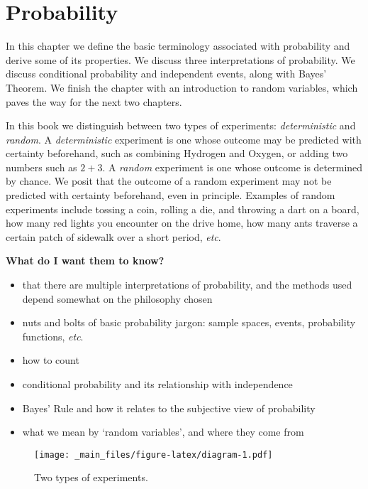 \documentclass[]{book}
\providecommand{\tightlist}{%
  \setlength{\itemsep}{0pt}\setlength{\parskip}{0pt}}
\numberwithin{equation}{chapter}
\numberwithin{figure}{chapter}
\theoremstyle{plain}
\theoremstyle{definition}
\theoremstyle{remark}
\theoremstyle{definition}
\theoremstyle{definition}
\theoremstyle{remark}
\begin{document}
\chapter{Probability}\label{cha-probability}

In this chapter we define the basic terminology associated with
probability and derive some of its properties. We discuss three
interpretations of probability. We discuss conditional probability and
independent events, along with Bayes' Theorem. We finish the chapter
with an introduction to random variables, which paves the way for the
next two chapters.

In this book we distinguish between two types of experiments:
\emph{deterministic} and \emph{random}. A \emph{deterministic}
experiment is one whose outcome may be predicted with certainty
beforehand, such as combining Hydrogen and Oxygen, or adding two numbers
such as \(2+3\). A \emph{random} experiment is one whose outcome is
determined by chance. We posit that the outcome of a random experiment
may not be predicted with certainty beforehand, even in principle.
Examples of random experiments include tossing a coin, rolling a die,
and throwing a dart on a board, how many red lights you encounter on the
drive home, how many ants traverse a certain patch of sidewalk over a
short period, \emph{etc}.

\textbf{What do I want them to know?}

\begin{itemize}
\tightlist
\item
  that there are multiple interpretations of probability, and the
  methods used depend somewhat on the philosophy chosen
\item
  nuts and bolts of basic probability jargon: sample spaces, events,
  probability functions, \emph{etc}.
\item
  how to count
\item
  conditional probability and its relationship with independence
\item
  Bayes' Rule and how it relates to the subjective view of probability
\item
  what we mean by `random variables', and where they come from
\end{itemize}

\begin{figure}[htbp]
\centering
\texttt{[image: \_main\_files/figure-latex/diagram-1.pdf]}
\caption{\label{fig:diagram}\small Two types of experiments.}
\end{figure}
\end{document}

